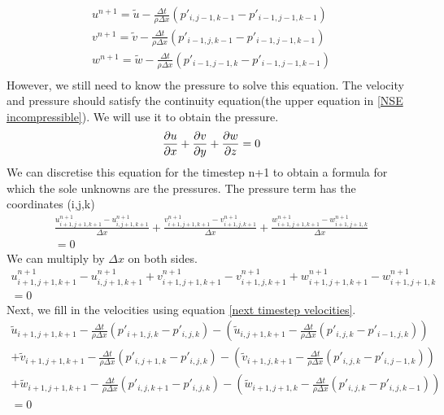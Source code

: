 \documentclass{article}
\begin{document}
\begin{equation}
  \begin{split}
    u^{n+1}=\tilde{u}-\frac{\Delta t}{\rho \Delta x}(p'_{i,j-1,k-1} - p'_{i-1,j-1,k-1})\\
    v^{n+1}=\tilde{v}-\frac{\Delta t}{\rho \Delta x}(p'_{i-1,j,k-1} - p'_{i-1,j-1,k-1})\\
    w^{n+1}=\tilde{w}-\frac{\Delta t}{\rho \Delta x}(p'_{i-1,j-1,k}- p'_{i-1,j-1,k-1})\\
  \end{split} \label{next timestep velocities}
\end{equation}
However, we still need to know the pressure to solve this equation. The velocity and pressure should satisfy the continuity equation(the upper equation in \ref{NSE incompressible}). We will use it to obtain the pressure.\cite{MAC}
\[
  \pdv{u}{x}+\pdv{v}{y}+\pdv{w}{z}=0
\]
We can discretise this equation for the timestep n+1 to obtain a formula for which the sole unknowns are the pressures. The pressure term has the coordinates (i,j,k)
\[
  \begin{split}
    \frac{u^{n+1}_{i+1,j+1,k+1}-u^{n+1}_{i, j+1, k+1}}{\Delta x} + 
    \frac{v^{n+1}_{i+1,j+1,k+1}-v^{n+1}_{i+1, j, k+1}}{\Delta x} + 
    \frac{w^{n+1}_{i+1,j+1,k+1}-w^{n+1}_{i+1, j+1, k}}{\Delta x}\\=0 
  \end{split}
\]
We can multiply by \(\Delta x\) on both sides.
\[
  \begin{split}
    u^{n+1}_{i+1,j+1,k+1}-u^{n+1}_{i, j+1, k+1} + 
    v^{n+1}_{i+1,j+1,k+1}-v^{n+1}_{i+1, j, k+1} + 
    w^{n+1}_{i+1,j+1,k+1}-w^{n+1}_{i+1, j+1, k}\\=0 
  \end{split}
\]
Next, we fill in the velocities using equation \ref{next timestep velocities}.
\[
  \begin{split}
    \tilde{u}_{i+1,j+1,k+1} - \frac{\Delta t}{\rho \Delta x}(p'_{i+1,j,k}-p'_{i,j,k})
    -\left(\tilde{u}_{i, j+1, k+1} - \frac{\Delta t}{\rho \Delta x}(p'_{i,j,k}-p'_{i-1,j,k})\right)\\
    +\tilde{v}_{i+1,j+1,k+1} - \frac{\Delta t}{\rho \Delta x}(p'_{i,j+1,k}-p'_{i,j,k})
    -\left(\tilde{v}_{i+1, j, k+1} - \frac{\Delta t}{\rho \Delta x}(p'_{i,j,k}-p'_{i,j-1,k})\right)\\
    +\tilde{w}_{i+1,j+1,k+1} - \frac{\Delta t}{\rho \Delta x}(p'_{i,j,k+1}-p'_{i,j,k})
    -\left(\tilde{w}_{i+1, j+1, k} - \frac{\Delta t}{\rho \Delta x}(p'_{i,j,k}-p'_{i,j,k-1})\right)\\
    =0
  \end{split}
\]
\end{document}
